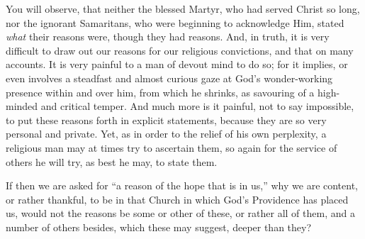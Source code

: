 You will observe, that neither the blessed Martyr, who had served
Christ so long, nor the ignorant Samaritans, who were beginning to
acknowledge Him, stated \emph{what} their reasons were, though they
had reasons. And, in truth, it is very difficult to draw out our
reasons for our religious convictions, and that on many accounts. It
is very painful to a man of devout mind to do so; for it implies, or
even involves a steadfast and almost curious gaze at God's
wonder-working presence within and over him, from which he shrinks, as
savouring of a high-minded and critical temper. And much more is it
painful, not to say impossible, to put these reasons forth in explicit
statements, because they are so very personal and private. Yet, as in
order to the relief of his own perplexity, a religious man may at
times try to ascertain them, so again for the service of others he
will try, as best he may, to state them.

If then we are asked for ``a reason of the hope that is in
us,'' why we are content, or rather thankful, to be in that Church
in which God's Providence has placed us, would not the reasons be some
or other of these, or rather all of them, and a number of others
besides, which these may suggest, deeper than they?

